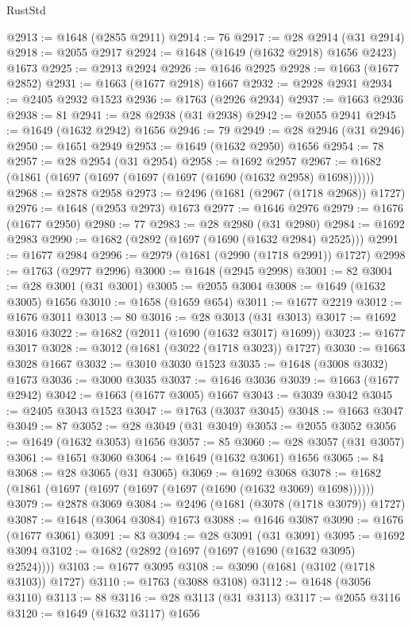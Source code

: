 \begin{lexlean}{RustStd}
\begin{coremodule}
@2913 := @1648 (@2855 @2911)
@2914 := 76
@2917 := @28 @2914 (@31 @2914)
@2918 := @2055 @2917
@2924 := @1648 (@1649 (@1632 @2918) @1656 @2423) @1673
@2925 := @2913 @2924
@2926 := @1646 @2925
@2928 := @1663 (@1677 @2852)
@2931 := @1663 (@1677 @2918) @1667
@2932 := @2928 @2931
@2934 := @2405 @2932 @1523
@2936 := @1763 (@2926 @2934)
@2937 := @1663 @2936
@2938 := 81
@2941 := @28 @2938 (@31 @2938)
@2942 := @2055 @2941
@2945 := @1649 (@1632 @2942) @1656
@2946 := 79
@2949 := @28 @2946 (@31 @2946)
@2950 := @1651 @2949
@2953 := @1649 (@1632 @2950) @1656
@2954 := 78
@2957 := @28 @2954 (@31 @2954)
@2958 := @1692 @2957
@2967 := @1682 (@1861 (@1697 (@1697 (@1697 (@1697 (@1690 (@1632 @2958) @1698))))))
@2968 := @2878 @2958
@2973 := @2496 (@1681 (@2967 (@1718 @2968)) @1727)
@2976 := @1648 (@2953 @2973) @1673
@2977 := @1646 @2976
@2979 := @1676 (@1677 @2950)
@2980 := 77
@2983 := @28 @2980 (@31 @2980)
@2984 := @1692 @2983
@2990 := @1682 (@2892 (@1697 (@1690 (@1632 @2984) @2525)))
@2991 := @1677 @2984
@2996 := @2979 (@1681 (@2990 (@1718 @2991)) @1727)
@2998 := @1763 (@2977 @2996)
@3000 := @1648 (@2945 @2998)
@3001 := 82
@3004 := @28 @3001 (@31 @3001)
@3005 := @2055 @3004
@3008 := @1649 (@1632 @3005) @1656
@3010 := @1658 (@1659 @654)
@3011 := @1677 @2219
@3012 := @1676 @3011
@3013 := 80
@3016 := @28 @3013 (@31 @3013)
@3017 := @1692 @3016
@3022 := @1682 (@2011 (@1690 (@1632 @3017) @1699))
@3023 := @1677 @3017
@3028 := @3012 (@1681 (@3022 (@1718 @3023)) @1727)
@3030 := @1663 @3028 @1667
@3032 := @3010 @3030 @1523
@3035 := @1648 (@3008 @3032) @1673
@3036 := @3000 @3035
@3037 := @1646 @3036
@3039 := @1663 (@1677 @2942)
@3042 := @1663 (@1677 @3005) @1667
@3043 := @3039 @3042
@3045 := @2405 @3043 @1523
@3047 := @1763 (@3037 @3045)
@3048 := @1663 @3047
@3049 := 87
@3052 := @28 @3049 (@31 @3049)
@3053 := @2055 @3052
@3056 := @1649 (@1632 @3053) @1656
@3057 := 85
@3060 := @28 @3057 (@31 @3057)
@3061 := @1651 @3060
@3064 := @1649 (@1632 @3061) @1656
@3065 := 84
@3068 := @28 @3065 (@31 @3065)
@3069 := @1692 @3068
@3078 := @1682 (@1861 (@1697 (@1697 (@1697 (@1697 (@1690 (@1632 @3069) @1698))))))
@3079 := @2878 @3069
@3084 := @2496 (@1681 (@3078 (@1718 @3079)) @1727)
@3087 := @1648 (@3064 @3084) @1673
@3088 := @1646 @3087
@3090 := @1676 (@1677 @3061)
@3091 := 83
@3094 := @28 @3091 (@31 @3091)
@3095 := @1692 @3094
@3102 := @1682 (@2892 (@1697 (@1697 (@1690 (@1632 @3095) @2524))))
@3103 := @1677 @3095
@3108 := @3090 (@1681 (@3102 (@1718 @3103)) @1727)
@3110 := @1763 (@3088 @3108)
@3112 := @1648 (@3056 @3110)
@3113 := 88
@3116 := @28 @3113 (@31 @3113)
@3117 := @2055 @3116
@3120 := @1649 (@1632 @3117) @1656

\end{coremodule}
\end{lexlean}
